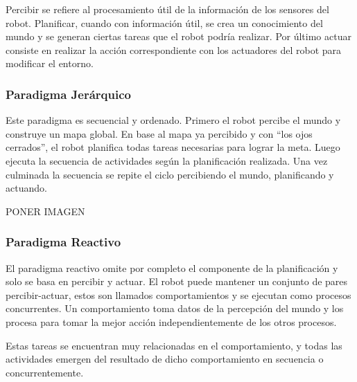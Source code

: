 Percibir se refiere al procesamiento útil de la información de los sensores del robot. Planificar, cuando con información útil, se crea un conocimiento del mundo y se generan ciertas tareas que el robot podría realizar. Por último actuar consiste en realizar la acción correspondiente con los actuadores del robot para modificar el entorno. 

\subsubsection{ Paradigma Jerárquico}

Este paradigma es secuencial y ordenado. Primero el robot percibe el mundo y construye un mapa global. En base al mapa ya percibido y con “los ojos cerrados”, el robot planifica todas tareas necesarias para lograr la meta. Luego ejecuta la secuencia de actividades según la planificación realizada. Una vez culminada la secuencia se repite el ciclo percibiendo el mundo, planificando y actuando. \cite{AiRobotics}

PONER IMAGEN

\subsubsection{Paradigma Reactivo}
El paradigma reactivo omite por completo el componente de la planificación y solo se basa en percibir y actuar. El robot puede mantener un conjunto de pares percibir-actuar, estos son llamados comportamientos y se ejecutan como procesos concurrentes. Un comportamiento toma datos de la percepción del mundo y los procesa para tomar la mejor acción independientemente de los otros procesos. \cite{AiRobotics}

Estas tareas se encuentran muy relacionadas en el comportamiento, y todas las actividades emergen del resultado de dicho comportamiento en secuencia o concurrentemente. 

